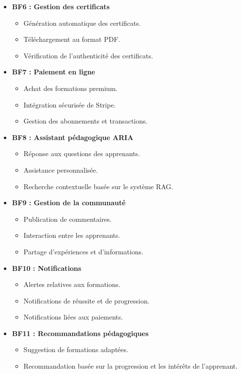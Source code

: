 \documentclass[12pt, a4paper]{report}
\begin{document}
\begin{itemize}
    \item \textbf{BF6 : Gestion des certificats}
    \begin{itemize}
        \item Génération automatique des certificats.
        \item Téléchargement au format PDF.
        \item Vérification de l'authenticité des certificats.
    \end{itemize}

    \item \textbf{BF7 : Paiement en ligne}
    \begin{itemize}
        \item Achat des formations premium.
        \item Intégration sécurisée de Stripe.
        \item Gestion des abonnements et transactions.
    \end{itemize}

    \item \textbf{BF8 : Assistant pédagogique ARIA}
    \begin{itemize}
        \item Réponse aux questions des apprenants.
        \item Assistance personnalisée.
        \item Recherche contextuelle basée sur le système RAG.
    \end{itemize}

    \item \textbf{BF9 : Gestion de la communauté}
    \begin{itemize}
        \item Publication de commentaires.
        \item Interaction entre les apprenants.
        \item Partage d'expériences et d'informations.
    \end{itemize}

    \item \textbf{BF10 : Notifications}
    \begin{itemize}
        \item Alertes relatives aux formations.
        \item Notifications de réussite et de progression.
        \item Notifications liées aux paiements.
    \end{itemize}

    \item \textbf{BF11 : Recommandations pédagogiques}
    \begin{itemize}
        \item Suggestion de formations adaptées.
        \item Recommandation basée sur la progression et les intérêts
        de l'apprenant.
    \end{itemize}
\end{itemize}
\end{document}
